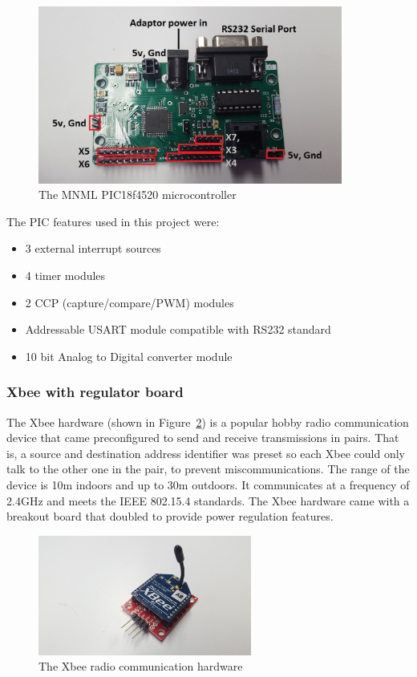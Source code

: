 \documentclass[11pt,a4paper]{article}
\begin{document}
    \begin{figure}[h]
        \includegraphics[width = 10cm]{pic.png}
        \caption{The MNML PIC18f4520 microcontroller}
        \label{fig:PIC1}
    \end{figure}
    The PIC features used in this project were:
    \begin{itemize}
      \item 3 external interrupt sources
      \item 4 timer modules
      \item 2 CCP (capture/compare/PWM) modules
      \item Addressable USART module compatible with RS232 standard
      \item 10 bit Analog to Digital converter module
    \end{itemize}

    \subsubsection{Xbee with regulator board}
      The Xbee hardware (shown in Figure~\ref{fig:xbee}) is a popular hobby radio communication device that came preconfigured to send and receive transmissions in pairs. That is, a source and destination address identifier was preset so each Xbee could only talk to the other one in the pair, to prevent miscommunications. The range of the device is 10m indoors and up to 30m outdoors. It communicates at a frequency of 2.4GHz and meets the IEEE 802.15.4 standards. The Xbee hardware came with a breakout board that doubled to provide power regulation features.
      \begin{figure}[h]
          \includegraphics[width=7cm]{xbee.png}
          \caption{The Xbee radio communication hardware}
          \label{fig:xbee}
      \end{figure}
\end{document}
